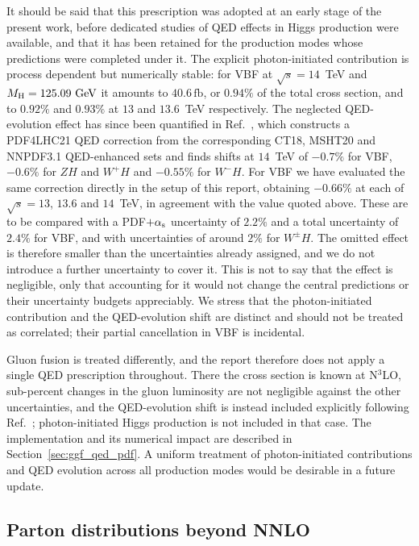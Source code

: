 It should be said that this prescription was adopted at an early stage of the
present work, before dedicated studies of QED effects in Higgs production were
available, and that it has been retained for the production modes whose
predictions were completed under it. The explicit photon-initiated contribution
is process dependent but numerically stable: for VBF at $\sqrt{s}=14$~TeV and
$M_\mathrm{H}=125.09~\mathrm{GeV}$ it amounts to $40.6\,\mathrm{fb}$, or $0.94\%$ of the total
cross section, and to $0.92\%$ and $0.93\%$ at $13$ and $13.6$~TeV
respectively. The neglected QED-evolution effect has since been quantified in
Ref.~\cite{Cooper-Sarkar:2025sqw}, which constructs a PDF4LHC21 QED correction
from the corresponding CT18, MSHT20 and NNPDF3.1 QED-enhanced sets and finds
shifts at $14$~TeV of $-0.7\%$ for VBF, $-0.6\%$ for $ZH$ and $W^+H$ and
$-0.55\%$ for $W^-H$. For VBF we have evaluated the same correction directly in
the setup of this report, obtaining $-0.66\%$ at each of $\sqrt{s}=13$, $13.6$
and $14$~TeV, in agreement with the value quoted above. These are to be compared with a PDF$+\alpha_{\mathrm{s}}$
uncertainty of $2.2\%$ and a total uncertainty of $2.4\%$ for VBF, and with
uncertainties of around $2\%$ for $W^\pm H$. The omitted effect is therefore
smaller than the uncertainties already assigned, and we do not introduce a
further uncertainty to cover it. This is not to say that the effect is
negligible, only that accounting for it would not change the central
predictions or their uncertainty budgets appreciably. We stress that the
photon-initiated contribution and the QED-evolution shift are distinct and
should not be treated as correlated; their partial cancellation in VBF is
incidental.

Gluon fusion is treated differently, and the report therefore does not apply a
single QED prescription throughout. There the cross section is known at
N$^3$LO, sub-percent changes in the gluon luminosity are not negligible against
the other uncertainties, and the QED-evolution shift is instead included
explicitly following Ref.~\cite{Cooper-Sarkar:2025sqw}; photon-initiated Higgs
production is not included in that case. The implementation and its numerical
impact are described in Section~\ref{sec:ggf_qed_pdf}. A uniform treatment of
photon-initiated contributions and QED evolution across all production modes
would be desirable in a future update.


\subsection{Parton distributions beyond NNLO}
\label{sec:an3lo-pdfs}

